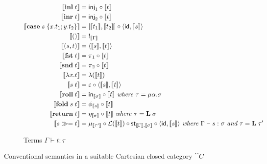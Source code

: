 \begin{figure}
\begin{subfigure}{\linewidth}
\begin{align*}
  \\
  \sem{\tmInl{t}} &= \mathsf{inj}_1 \comp \sem{t}
  \\
  \sem{\tmInr{t}} &= \mathsf{inj}_2 \comp \sem{t}
  \\
  \sem{\tmCase{s}{x}{t_1}{y}{t_2}} &= \coprodM{\sem{t_1}}{\sem{t_2}} \comp \prodM{\id}{\sem{s}}
  \\
  \sem{\tmUnit} &=\;!_{\sem{\Gamma}}
  \\
  \sem{\tmPair{s}{t}} &= \prodM{\sem{s}}{\sem{t}}
  \\
  \sem{\tmFst{t}} &= \pi_1 \comp \sem{t}
  \\
  \sem{\tmSnd{t}} &= \pi_2 \comp \sem{t}
  \\
  \sem{\tmFun{x}{t}} &= \lambda(\sem{t})
  \\
  \sem{\tmApp{s}{t}} &= \eval \comp \prodM{\sem{s}}{\sem{t}}
  \\
  \sem{\tmRoll{t}} &= \inMap_{\sem{\sigma}} \comp \sem{t}
  \textit{ where }\tau = \mu\alpha.\sigma
  \\
  \sem{\tmFold{s}{t}} &= \phi_{\sem{s}} \comp \sem{t}
  \\
  \sem{\tmReturn{t}} &= \eta_{\sem{\sigma}} \comp \sem{t}
  \textit{ where }\tau = \tyLift\;\sigma
  \\
  \sem{\tmBind{s}{t}} &= \mu_{\sem{\tau'}} \comp \mathcal{L}(\sem{t}) \comp \mathsf{st}_{\sem{\Gamma},\sem{\sigma}} \comp \prodM{\id}{\sem{s}}
  \textit{ where }\Gamma \vdash s: \sigma\textit{ and }\tau = \tyLift\;\tau'
  \end{align*}
  \caption{Terms $\Gamma \vdash t: \tau$}
  \label{fig:default-semantics:terms}
\end{subfigure}
\caption{Conventional semantics in a suitable Cartesian closed category $\cat{C}$}
\end{figure}
